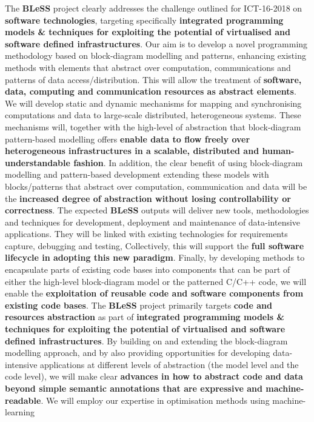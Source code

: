\documentclass[a4paper,11pt]{article}
\newcommand{\project}[1]{\textbf{#1}\xspace}
\newcommand{\BLESS}{\project{BLeSS}}
\newcommand{\TheProject}{\BLESS}
\begin{document}
The \TheProject{} project clearly addresses the challenge outlined for ICT-16-2018 on 
\textbf{software technologies}, targeting specifically \textbf{integrated programming models \& techniques 
for exploiting the potential of virtualised and software defined infrastructures}. %
Our aim is to develop a novel programming methodology based on block-diagram modelling and patterns, enhancing existing
methods with elements that abstract over computation, communications and patterns of data access/distribution.
This will allow the treatment of \textbf{software, data, computing and communication resources as abstract 
elements}. We will develop static and dynamic mechanisms for mapping and synchronising
computations and data to large-scale distributed, heterogeneous systems. These mechanisms will, together with
the high-level of abstraction that block-diagram pattern-based modelling offers \textbf{enable data to flow freely 
over heterogeneous infrastructures in a scalable, distributed and human-understandable fashion}.
In addition, the clear benefit of using block-diagram modelling and pattern-based development extending these models with
blocks/patterns that abstract over computation, communication and data will be the \textbf{increased degree of
abstraction without losing controllability or correctness}. The expected \TheProject{}
outputs will deliver new tools, methodologies and techniques for development, deployment and
maintenance of data-intensive applications. 
They will be linked with existing technologies for requirements capture, debugging and testing,
Collectively, this will support the
\textbf{full software lifecycle in adopting this new paradigm}. Finally, by developing methods to encapsulate
parts of existing code bases into components that can be part of either the high-level block-diagram
model or the patterned C/C++ code, we will enable the \textbf{ exploitation of reusable code and software 
components from existing code bases}.
%
The \TheProject{} project primarily targets \textbf{code and resources abstraction} as part of \textbf{integrated
programming models \& techniques for exploiting the potential of virtualised and software defined infrastructures}. 
By building on and extending the block-diagram modelling approach, and by also providing opportunities for developing
data-intensive applications at different levels of abstraction (the model level and the code level), we 
will make clear \textbf{advances in how to abstract code and data beyond simple semantic annotations that 
are expressive and machine-readable}. We will employ our expertise in optimisation methods using machine-learning
\end{document}
